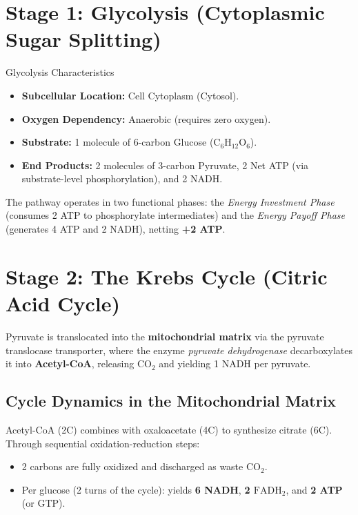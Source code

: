 \documentclass[11pt,a4paper]{article}
\begin{document}
\vspace{10pt}

\section{Stage 1: Glycolysis (Cytoplasmic Sugar Splitting)}

\begin{biobox}{Glycolysis Characteristics}
\begin{itemize}[leftmargin=1.5em, itemsep=3pt]
    \item \textbf{Subcellular Location:} Cell Cytoplasm (Cytosol).
    \item \textbf{Oxygen Dependency:} Anaerobic (requires zero oxygen).
    \item \textbf{Substrate:} 1 molecule of 6-carbon Glucose ($\text{C}_6\text{H}_{12}\text{O}_6$).
    \item \textbf{End Products:} 2 molecules of 3-carbon Pyruvate, 2 Net ATP (via substrate-level phosphorylation), and 2 NADH.
\end{itemize}
\end{biobox}

The pathway operates in two functional phases: the \textit{Energy Investment Phase} (consumes 2 ATP to phosphorylate intermediates) and the \textit{Energy Payoff Phase} (generates 4 ATP and 2 NADH), netting \textbf{+2 ATP}.

\vspace{10pt}

\section{Stage 2: The Krebs Cycle (Citric Acid Cycle)}

Pyruvate is translocated into the \textbf{mitochondrial matrix} via the pyruvate translocase transporter, where the enzyme \textit{pyruvate dehydrogenase} decarboxylates it into \textbf{Acetyl-CoA}, releasing $\text{CO}_2$ and yielding 1 NADH per pyruvate.

\subsection{Cycle Dynamics in the Mitochondrial Matrix}
Acetyl-CoA (2C) combines with oxaloacetate (4C) to synthesize citrate (6C). Through sequential oxidation-reduction steps:
\begin{itemize}[leftmargin=1.5em, itemsep=2pt]
    \item 2 carbons are fully oxidized and discharged as waste $\text{CO}_2$.
    \item Per glucose (2 turns of the cycle): yields \textbf{6 NADH}, \textbf{2 $\text{FADH}_2$}, and \textbf{2 ATP} (or GTP).
\end{itemize}
\end{document}
